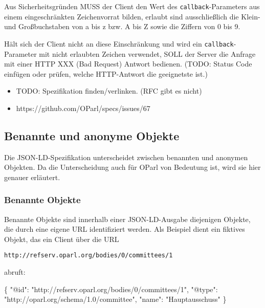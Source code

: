 \documentclass[,a4paper]{article}
\newenvironment{Shaded}{}{}
\newcommand{\DataTypeTok}[1]{\textcolor[rgb]{0.56,0.13,0.00}{{#1}}}
\newcommand{\StringTok}[1]{\textcolor[rgb]{0.25,0.44,0.63}{{#1}}}
\newcommand{\NormalTok}[1]{{#1}}
\begin{document}
Aus Sicherheitsgründen MUSS der Client den Wert des
\texttt{callback}-Parameters aus einem eingeschränkten Zeichenvorrat
bilden, erlaubt sind ausschließlich die Klein- und Großbuchstaben von a
bis z bzw. A bis Z sowie die Ziffern von 0 bis 9.

Hält sich der Client nicht an diese Einschränkung und wird ein
\texttt{callback}-Parameter mit nicht erlaubten Zeichen verwendet, SOLL
der Server die Anfrage mit einer HTTP XXX (Bad Request) Antwort
bedienen. (TODO: Status Code einfügen oder prüfen, welche HTTP-Antwort
die geeignetste ist.)

\begin{itemize}
\itemsep1pt\parskip0pt
\item
  TODO: Spezifikation finden/verlinken. (RFC gibt es nicht)
\item
  https://github.com/OParl/specs/issues/67
\end{itemize}

\subsection{Benannte und anonyme
Objekte}\label{benannte-und-anonyme-objekte}

Die JSON-LD-Spezifikation unterscheidet zwischen benannten und anonymen
Objekten. Da die Unterscheidung auch für OParl von Bedeutung ist, wird
sie hier genauer erläutert.

\subsubsection{Benannte Objekte}\label{benannte-objekte}

Benannte Objekte sind innerhalb einer JSON-LD-Ausgabe diejenigen
Objekte, die durch eine eigene URL identifiziert werden. Als Beispiel
dient ein fiktives Objekt, das ein Client über die URL

\begin{verbatim}
http://refserv.oparl.org/bodies/0/committees/1
\end{verbatim}

abruft:

\begin{Shaded}
\begin{Highlighting}[]
\NormalTok{\{}
    \DataTypeTok{"@id"}\NormalTok{: }\StringTok{"http://refserv.oparl.org/bodies/0/committees/1"}\NormalTok{,}
    \DataTypeTok{"@type"}\NormalTok{: }\StringTok{"http://oparl.org/schema/1.0/committee"}\NormalTok{,}
    \DataTypeTok{"name"}\NormalTok{: }\StringTok{"Hauptausschuss"}
\NormalTok{\}}
\end{Highlighting}
\end{Shaded}
\end{document}
